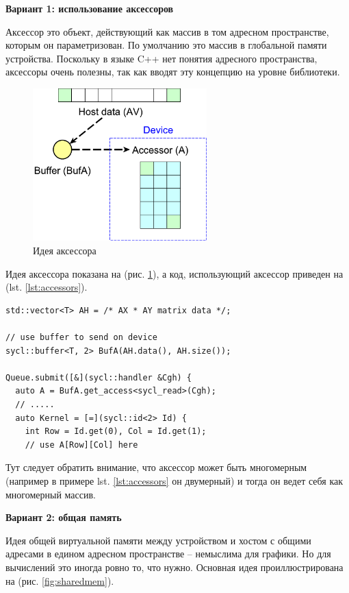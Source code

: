 \documentclass[a4paper,12pt,oneside]{article}
\begin{document}
\textbf{Вариант 1: использование аксессоров}

Аксессор это объект, действующий как массив в том адресном пространстве, которым он параметризован.
По умолчанию это массив в глобальной памяти устройства.
Поскольку в языке C++ нет понятия адресного пространства, аксессоры очень полезны, так как вводят эту концепцию на уровне библиотеки.

\begin{figure}
\centering
\includegraphics[width=0.6\textwidth]{pictures/accessors.pdf}
\caption{Идея аксессора}
\label{fig:accessors}
\end{figure}

Идея аксессора показана на (рис. \ref{fig:accessors}), а код, использующий аксессор приведен на (lst. \ref{lst:accessors}).

\begin{lstlisting}[caption={Использование аксессора},label={lst:accessors}]
std::vector<T> AH = /* AX * AY matrix data */;

// use buffer to send on device
sycl::buffer<T, 2> BufA(AH.data(), AH.size());

Queue.submit([&](sycl::handler &Cgh) { 
  auto A = BufA.get_access<sycl_read>(Cgh);
  // .....
  auto Kernel = [=](sycl::id<2> Id) {
    int Row = Id.get(0), Col = Id.get(1);
    // use A[Row][Col] here
\end{lstlisting}

Тут следует обратить внимание, что аксессор может быть многомерным (например в примере lst. \ref{lst:accessors} он двумерный) и тогда он ведет себя как многомерный массив.

\textbf{Вариант 2: общая память}

Идея общей виртуальной памяти между устройством и хостом с общими адресами в едином адресном пространстве -- немыслима для графики.
Но для вычислений это иногда ровно то, что нужно.
Основная идея проиллюстрирована на (рис. \ref{fig:sharedmem}).
\end{document}
